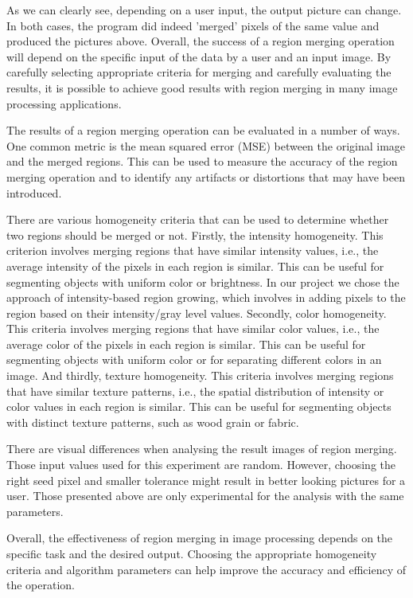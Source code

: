 \documentclass[12pt]{article}
\begin{document}
As we can clearly see, depending on a user input, the output picture can change. In both cases, the program did indeed 'merged' pixels of the same value and produced the pictures above. Overall, the success of a region merging operation will depend on the specific input of the data by a user and an input image. By carefully selecting appropriate criteria for merging and carefully evaluating the results, it is possible to achieve good results with region merging in many image processing applications.

The results of a region merging operation can be evaluated in a number of ways. One common metric is the mean squared error (MSE) between the original image and the merged regions. This can be used to measure the accuracy of the region merging operation and to identify any artifacts or distortions that may have been introduced. 

There are various homogeneity criteria that can be used to determine whether two regions should be merged or not. Firstly, the intensity homogeneity. This criterion involves merging regions that have similar intensity values, i.e., the average intensity of the pixels in each region is similar. This can be useful for segmenting objects with uniform color or brightness. In our project we chose the approach of intensity-based region growing, which involves in adding pixels to the region based on their intensity/gray level values. Secondly, color homogeneity. This criteria involves merging regions that have similar color values, i.e., the average color of the pixels in each region is similar. This can be useful for segmenting objects with uniform color or for separating different colors in an image. And thirdly, texture homogeneity. This criteria involves merging regions that have similar texture patterns, i.e., the spatial distribution of intensity or color values in each region is similar. This can be useful for segmenting objects with distinct texture patterns, such as wood grain or fabric.

There are visual differences when analysing the result images of region merging. Those input values used for this experiment are random. However, choosing the right seed pixel and smaller tolerance might result in better looking pictures for a user. Those presented above are only experimental for the analysis with the same parameters. 

Overall, the effectiveness of region merging in image processing depends on the specific task and the desired output. Choosing the appropriate homogeneity criteria and algorithm parameters can help improve the accuracy and efficiency of the operation.
\end{document}
